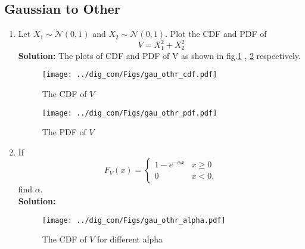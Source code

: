 \documentclass{article}
\numberwithin{equation}{subsection}
\numberwithin{figure}{subsection}
\providecommand{\gauss}[2]{\mathcal{N}\ensuremath{\left(#1,#2\right)}}
\newcommand{\solution}{\noindent \textbf{Solution: }}
\renewcommand\thesection{\arabic{section}}
\renewcommand\thesubsection{\thesection.\arabic{subsection}}
\begin{document}
\subsection{Gaussian to Other}
\begin{enumerate}[label=\thesubsection.\arabic*,ref=\thesubsection.\arabic{figure}]
\item
Let $X_1 \sim  \gauss{0}{1}$ and $X_2 \sim  \gauss{0}{1}$. Plot the CDF and PDF of
%
\begin{equation}
V = X_1^2 + X_2^2
\end{equation}
\solution 
The plots of CDF and PDF of V as shown in fig.\ref{fig:gauss_cdf1} , \ref{fig:gauss_pdf1} respectively.
\begin{center}
\end{center}
\begin{center}
\end{center}
\begin{figure}
\centering
\texttt{[image: ../dig\_com/Figs/gau\_othr\_cdf.pdf]}  
\caption{The CDF of $V$}
\label{fig:gauss_cdf1}
\end{figure}
\begin{figure}
\centering
\texttt{[image: ../dig\_com/Figs/gau\_othr\_pdf.pdf]}   
\caption{The PDF of $V$}
\label{fig:gauss_pdf1}
\end{figure}
\item
If
%
\begin{equation}
F_{V}(x) = 
\begin{cases}
1 - e^{-\alpha x} & x \geq 0 \\
0 & x < 0,
\end{cases}
\end{equation}
%
find $\alpha$.\\
\solution
\begin{center}
\end{center}
\begin{figure}
\centering
\texttt{[image: ../dig\_com/Figs/gau\_othr\_alpha.pdf]}    
\caption{The CDF of $V$ for different alpha}
\label{fig:gauss_cdf_alpha}

\end{figure}
\end{enumerate}
\end{document}
